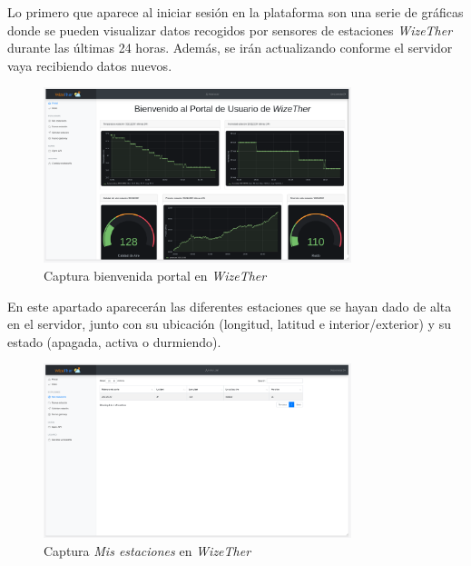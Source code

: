 \documentclass[12pt]{article}
\begin{document}
Lo primero que aparece al iniciar sesión en la plataforma son una serie de gráficas donde se pueden visualizar datos recogidos por sensores de estaciones \textit{WizeTher} durante las últimas 24 horas. Además, se irán actualizando conforme el servidor vaya recibiendo datos nuevos. 

\begin{figure}[h]
	\begin{center}
		\includegraphics[width=0.8\textwidth]{img_rani/dashboard_user.png}
		\caption{Captura bienvenida portal en \textit{WizeTher}}
	\end{center}
\end{figure}

\pagebreak

\noindent En este apartado aparecerán las diferentes estaciones que se hayan dado de alta en el servidor, junto con su ubicación (longitud, latitud e interior/exterior) y su estado (apagada, activa o durmiendo).

\begin{figure}[h]
	\begin{center}
		\includegraphics[width=0.8\textwidth]{img_rani/mis_estaciones.png}
		\caption{Captura \textit{Mis estaciones} en \textit{WizeTher}}
	\end{center}
\end{figure}
\end{document}
